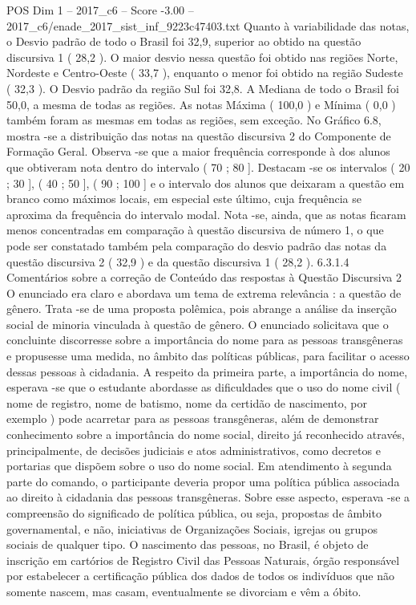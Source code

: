 \begin{textsample}{POS Dim 1 – 2017\_c6 – Score -3.00 – 2017\_c6/enade\_2017\_sist\_inf\_9223c47403.txt}
Quanto à variabilidade das notas, o Desvio padrão de todo o Brasil foi 32,9, superior ao obtido na questão discursiva 1 ( 28,2 ).
O maior desvio nessa questão foi obtido nas regiões Norte, Nordeste e Centro-Oeste ( 33,7 ), enquanto o menor foi obtido na região Sudeste ( 32,3 ).
O Desvio padrão da região Sul foi 32,8.
A Mediana de todo o Brasil foi 50,0, a mesma de todas as regiões.
As notas Máxima ( 100,0 ) e Mínima ( 0,0 ) também foram as mesmas em todas as regiões, sem exceção.
No Gráfico 6.8, mostra -se a distribuição das notas na questão discursiva 2 do Componente de Formação Geral.
Observa -se que a maior frequência corresponde à dos alunos que obtiveram nota dentro do intervalo ( 70 ; 80 ].
Destacam -se os intervalos ( 20 ; 30 ], ( 40 ; 50 ], ( 90 ; 100 ] e o intervalo dos alunos que deixaram a questão em branco como máximos locais, em especial este último, cuja frequência se aproxima da frequência do intervalo modal.
Nota -se, ainda, que as notas ficaram menos concentradas em comparação à questão discursiva de número 1, o que pode ser constatado também pela comparação do desvio padrão das notas da questão discursiva 2 ( 32,9 ) e da questão discursiva 1 ( 28,2 ). 6.3.1.4 Comentários sobre a correção de Conteúdo das respostas à Questão Discursiva 2 O enunciado era claro e abordava um tema de extrema relevância : a questão de gênero.
Trata -se de uma proposta polêmica, pois abrange a análise da inserção social de minoria vinculada à questão de gênero.
O enunciado solicitava que o concluinte discorresse sobre a importância do nome para as pessoas transgêneras e propusesse uma medida, no âmbito das políticas públicas, para facilitar o acesso dessas pessoas à cidadania.
A respeito da primeira parte, a importância do nome, esperava -se que o estudante abordasse as dificuldades que o uso do nome civil ( nome de registro, nome de batismo, nome da certidão de nascimento, por exemplo ) pode acarretar para as pessoas transgêneras, além de demonstrar conhecimento sobre a importância do nome social, direito já reconhecido através, principalmente, de decisões judiciais e atos administrativos, como decretos e portarias que dispõem sobre o uso do nome social.
Em atendimento à segunda parte do comando, o participante deveria propor uma política pública associada ao direito à cidadania das pessoas transgêneras.
Sobre esse aspecto, esperava -se a compreensão do significado de política pública, ou seja, propostas de âmbito governamental, e não, iniciativas de Organizações Sociais, igrejas ou grupos sociais de qualquer tipo.
O nascimento das pessoas, no Brasil, é objeto de inscrição em cartórios de Registro Civil das Pessoas Naturais, órgão responsável por estabelecer a certificação pública dos dados de todos os indivíduos que não somente nascem, mas casam, eventualmente se divorciam e vêm a óbito.

\end{textsample}
